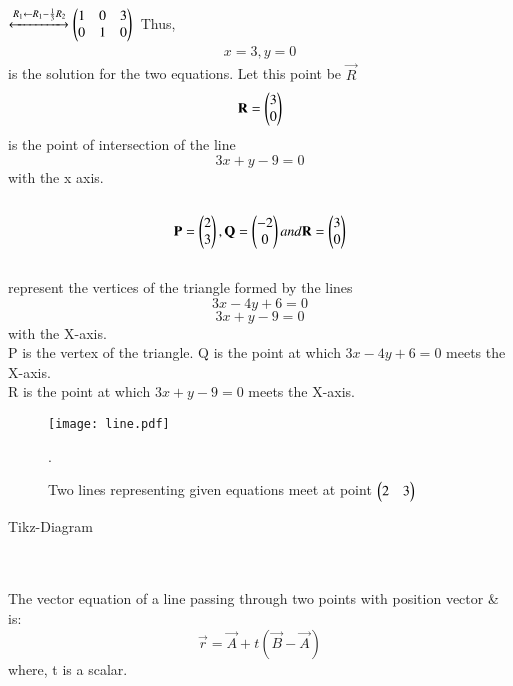 \documentclass[journal,12pt,twocolumn]{IEEEtran}
\renewcommand\thesection{\arabic{section}}
\begin{document}
\begin{enumerate}[label=\thesection.\arabic*.,ref=\thesection.\theenumi]
\begin{enumerate}
          $\xleftrightarrow{R_1 \leftarrow R_1 - \frac{1}{3}R_2}
    \begin{pmatrix}1 &0&3\\
        0&1&0\end{pmatrix}\\$
Thus,
\begin{align}
    x=3, y=0
\end{align} 
is the solution for the two equations. 
Let this point be $\vec{R}$\\
\[\mathbf{R}=\begin{pmatrix}3\\0\end{pmatrix}\]
is the point of intersection of the line \[3x+y-9=0\] with the x axis.
\\
\\

\therefore
    \[\mathbf{P}=\begin{pmatrix}2\\3\end{pmatrix},\\ \mathbf{Q}=\begin{pmatrix}-2\\0\end{pmatrix} and\\ \mathbf{R}=\begin{pmatrix}3\\0\end{pmatrix}\] \\
    represent the vertices of the triangle formed by the lines \\
    \[ 3x-4y+6=0 \]
    \[ 3x+y-9=0 \]
    with the X-axis.\\
        P is the vertex of the triangle.
        Q is the point at which \(3x-4y+6=0\) meets the X-axis.\\
        R is the point at which \(3x+y-9=0\) meets the X-axis.\\
\end{enumerate}
\begin{figure}[h]
\texttt{[image: line.pdf]}
\caption{Two lines representing given equations meet at point $\begin{pmatrix}2 & 3\end{pmatrix}$ }.
\end{figure}
\begin{center}
    Tikz-Diagram
\end{center}
\\\\
The vector equation of a line passing through two points with position vector  \&  is:
\[\vec{r}=\vec{A}+t(\vec{B}-\vec{A})\]
where, t is a scalar.
\\

\end{enumerate}
\end{document}
